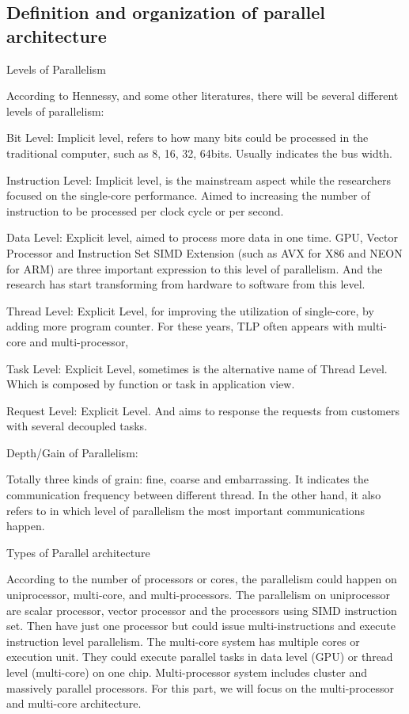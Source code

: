 \subsection{Definition and organization of parallel architecture}
\par Levels of Parallelism
\par According to Hennessy\cite{hennessy2017computer}, and some other literatures, there will be several different levels of parallelism:
\par Bit Level: Implicit level, refers to how many bits could be processed in the traditional computer, such as 8, 16, 32, 64bits. Usually indicates the bus width.
\par Instruction Level: Implicit level, is the mainstream aspect while the researchers focused on the single-core performance. Aimed to increasing the number of instruction to be processed per clock cycle or per second.  
\par Data Level: Explicit level, aimed to process more data in one time. GPU, Vector Processor and Instruction Set SIMD Extension (such as AVX for X86 and NEON for ARM) are three important expression to this level of parallelism. And the research has start transforming from hardware to software from this level.
\par Thread Level: Explicit Level, for improving the utilization of single-core, by adding more program counter. For these years, TLP often appears with multi-core and multi-processor, 
\par Task Level: Explicit Level, sometimes is the alternative name of Thread Level. Which is composed by function or task in application view.
\par Request Level: Explicit Level. And aims to response the requests from customers with several decoupled tasks. 
\par Depth/Gain of Parallelism:
\par Totally three kinds of grain: fine, coarse and embarrassing. It indicates the communication frequency between different thread. In the other hand, it also refers to in which level of parallelism the most important communications happen.
\par Types of Parallel architecture 
\par According to the number of processors or cores, the parallelism could happen on uniprocessor, multi-core, and multi-processors. The parallelism on uniprocessor are scalar processor, vector processor and the processors using SIMD instruction set. Then have just one processor but could issue multi-instructions and execute instruction level parallelism. The multi-core system has multiple cores or execution unit. They could execute parallel tasks in data level (GPU) or thread level (multi-core) on one chip. Multi-processor system includes cluster and massively parallel processors. For this part, we will focus on the multi-processor and multi-core architecture.
